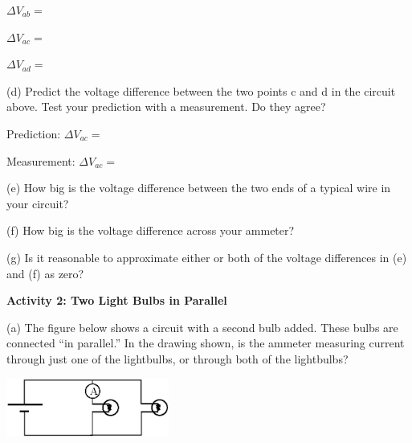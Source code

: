 \vspace{0.3 in}
\hspace{0.5 in} $\Delta V_{ab} = $ \par
\hspace{0.5 in} $\Delta V_{ac} = $ \par
\hspace{0.5 in} $\Delta V_{ad} = $ \par
\vspace{0.6 in}

(d)  Predict the voltage difference between the two points c and d in the circuit above.  Test your prediction with a measurement.  Do they agree? \par
\hspace{0.5 in} Prediction:   $\Delta V_{ac} = $ \par
\vspace{0.2 in}
\hspace{0.5 in} Measurement:   $\Delta V_{ac} = $ \par
\vspace{0.3 in}
(e) How big is the voltage difference between the two ends of a typical wire in your circuit?
\vspace{0.6 in}



(f) How big is the voltage difference across your ammeter?  
\vspace{0.6 in}



(g) Is it reasonable to approximate either or both of the voltage differences in (e) and (f) as zero?
\vspace{0.6 in}



\textbf{Activity 2: Two Light Bulbs in Parallel}

(a) The figure below shows a circuit with a second bulb added.  These bulbs are connected ``in parallel.''  In the drawing shown, is the ammeter measuring current through just one of the lightbulbs, or through both of the lightbulbs?
\vspace{-0.1in}
\begin{flushright}
\includegraphics[width=0.4\textwidth]{electric_circuits/circ_diag3.eps}
\end{flushright}
\vspace{-0.1in}


